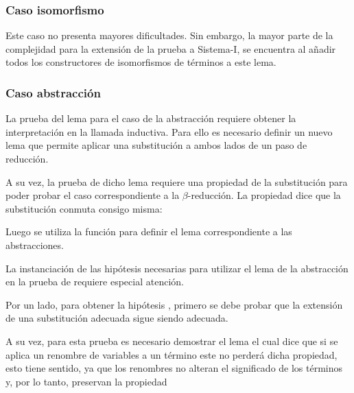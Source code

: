 \subsubsection{Caso isomorfismo}

Este caso no presenta mayores dificultades. Sin embargo, la mayor parte de la complejidad para la extensión de la prueba a Sistema-I, se encuentra al añadir todos los constructores de isomorfismos de términos a este lema.


\subsubsection{Caso abstracción}

La prueba del lema para el caso de la abstracción requiere obtener la interpretación  en la llamada inductiva.
Para ello es necesario definir un nuevo lema que permite aplicar una substitución a ambos lados de un paso de reducción.


A su vez, la prueba de dicho lema requiere una propiedad de la substitución para poder probar el caso correspondiente a la $\beta$-reducción.
La propiedad  dice que la substitución conmuta consigo misma:


Luego se utiliza la función  para definir el lema correspondiente a las abstracciones.


La instanciación de las hipótesis necesarias para utilizar el lema de la abstracción en la prueba de  requiere especial atención.

Por un lado, para obtener la hipótesis \snstar {}, primero se debe probar que la extensión de una substitución adecuada sigue siendo adecuada.


A su vez, para esta prueba es necesario demostrar el lema  el cual dice que si se aplica un renombre de variables a un término \snstar este no perderá dicha propiedad, esto tiene sentido, ya que los renombres no alteran el significado de los términos y, por lo tanto, preservan la propiedad \snstar

